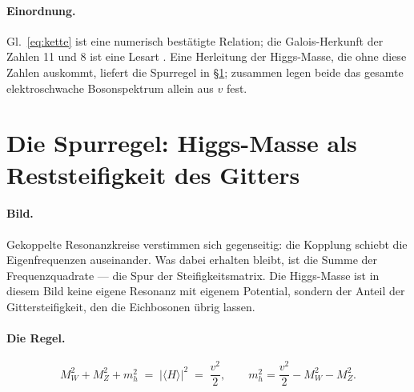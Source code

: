 \paragraph{Einordnung.}
Gl.~\eqref{eq:kette} ist eine numerisch bestätigte Relation; die
Galois-Herkunft der Zahlen 11 und 8 ist eine Lesart \SM. Eine Herleitung
der Higgs-Masse, die ohne diese Zahlen auskommt, liefert die Spurregel in
§\ref{sec:spur}; zusammen legen beide das gesamte elektroschwache
Bosonspektrum allein aus $v$ fest.

\section{Die Spurregel: Higgs-Masse als Reststeifigkeit des Gitters}
\label{sec:spur}

\paragraph{Bild.}
Gekoppelte Resonanzkreise verstimmen sich gegenseitig: die Kopplung schiebt
die Eigenfrequenzen auseinander. Was dabei erhalten bleibt, ist die Summe
der Frequenzquadrate --- die Spur der Steifigkeitsmatrix. Die Higgs-Masse
ist in diesem Bild keine eigene Resonanz mit eigenem Potential, sondern der
Anteil der Gittersteifigkeit, den die Eichbosonen übrig lassen.

\paragraph{Die Regel.}
\begin{equation}
  M_W^2 + M_Z^2 + m_h^2 \;=\; |\langle H\rangle|^2 \;=\; \frac{v^2}{2},
  \qquad
  m_h^2 = \frac{v^2}{2} - M_W^2 - M_Z^2 .
  \label{eq:spur}
\end{equation}

